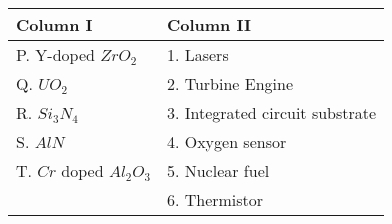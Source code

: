 \begin{tabular}{| p{4cm} | p{6cm} |}
    \hline
    \textbf{Column I} & \textbf{Column II} \\
    \hline
    P. Y-doped $ZrO_2$ & 1. Lasers \\
    \hline
    Q. $UO_2$ & 2. Turbine Engine \\
    \hline
    R. $Si_{3}N_{4}$ & 3. Integrated circuit substrate \\
    \hline
    S. $AlN$ & 4. Oxygen sensor \\
    \hline
    T. $Cr$ doped $Al_{2}O_{3}$ & 5. Nuclear fuel \\
    \hline
    & 6. Thermistor \\
    \hline
\end{tabular}
